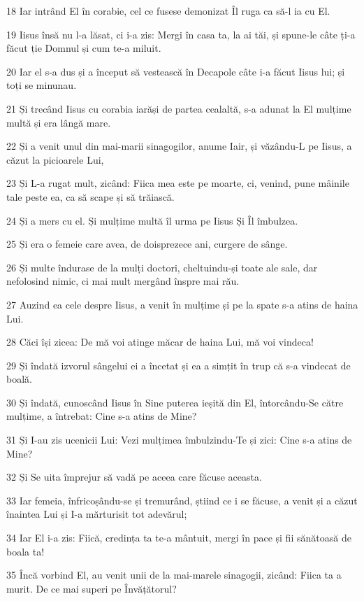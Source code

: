 \par 18 Iar intrând El în corabie, cel ce fusese demonizat Îl ruga ca să-l ia cu El.
\par 19 Iisus însă nu l-a lăsat, ci i-a zis: Mergi în casa ta, la ai tăi, și spune-le câte ți-a făcut ție Domnul și cum te-a miluit.
\par 20 Iar el s-a dus și a început să vestească în Decapole câte i-a făcut Iisus lui; și toți se minunau.
\par 21 Și trecând Iisus cu corabia iarăși de partea cealaltă, s-a adunat la El mulțime multă și era lângă mare.
\par 22 Și a venit unul din mai-marii sinagogilor, anume Iair, și văzându-L pe Iisus, a căzut la picioarele Lui,
\par 23 Și L-a rugat mult, zicând: Fiica mea este pe moarte, ci, venind, pune mâinile tale peste ea, ca să scape și să trăiască.
\par 24 Și a mers cu el. Și mulțime multă îl urma pe Iisus Și Îl îmbulzea.
\par 25 Și era o femeie care avea, de doisprezece ani, curgere de sânge.
\par 26 Și multe îndurase de la mulți doctori, cheltuindu-și toate ale sale, dar nefolosind nimic, ci mai mult mergând înspre mai rău.
\par 27 Auzind ea cele despre Iisus, a venit în mulțime și pe la spate s-a atins de haina Lui.
\par 28 Căci își zicea: De mă voi atinge măcar de haina Lui, mă voi vindeca!
\par 29 Și îndată izvorul sângelui ei a încetat și ea a simțit în trup că s-a vindecat de boală.
\par 30 Și îndată, cunoscând Iisus în Sine puterea ieșită din El, întorcându-Se către mulțime, a întrebat: Cine s-a atins de Mine?
\par 31 Și I-au zis ucenicii Lui: Vezi mulțimea îmbulzindu-Te și zici: Cine s-a atins de Mine?
\par 32 Și Se uita împrejur să vadă pe aceea care făcuse aceasta.
\par 33 Iar femeia, înfricoșându-se și tremurând, știind ce i se făcuse, a venit și a căzut înaintea Lui și I-a mărturisit tot adevărul;
\par 34 Iar El i-a zis: Fiică, credința ta te-a mântuit, mergi în pace și fii sănătoasă de boala ta!
\par 35 Încă vorbind El, au venit unii de la mai-marele sinagogii, zicând: Fiica ta a murit. De ce mai superi pe Învățătorul?
